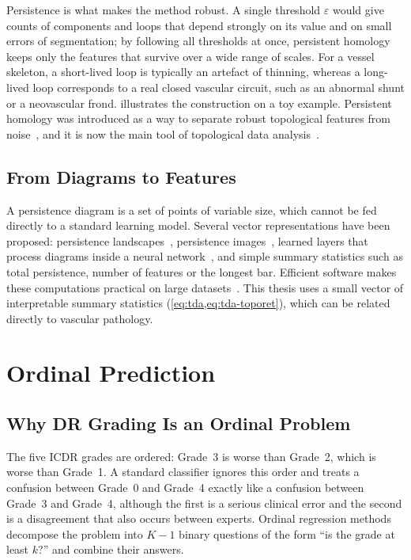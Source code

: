 Persistence is what makes the method robust. A single threshold $\varepsilon$ would give
counts of components and loops that depend strongly on its value and on small errors of
segmentation; by following all thresholds at once, persistent homology keeps only the
features that survive over a wide range of scales. For a vessel skeleton, a short-lived
loop is typically an artefact of thinning, whereas a long-lived loop corresponds to a real
closed vascular circuit, such as an abnormal shunt or a neovascular frond.
 illustrates the construction on a toy example. Persistent homology
was introduced as a way to separate robust topological features from
noise~\cite{edelsbrunner2002persistence,zomorodian2005computing}, and it is now the main
tool of topological data analysis~\cite{carlsson2009topology,chazal2021intro}.



\subsection{From Diagrams to Features}

A persistence diagram is a set of points of variable size, which cannot be fed directly to
a standard learning model. Several vector representations have been proposed: persistence
landscapes~\cite{bubenik2015landscapes}, persistence images~\cite{adams2017images}, learned
layers that process diagrams inside a neural
network~\cite{hofer2017topological,carriere2020perslay}, and simple summary statistics such
as total persistence, number of features or the longest bar. Efficient software makes these
computations practical on large datasets~\cite{otter2017roadmap,maria2014gudhi,
tauzin2021giotto}. This thesis uses a small vector of interpretable summary statistics
(\cref{eq:tda,eq:tda-toporet}), which can be related directly to vascular pathology.

\section{Ordinal Prediction}
\label{sec:coral}

\subsection{Why DR Grading Is an Ordinal Problem}

The five ICDR grades are ordered: Grade~3 is worse than Grade~2, which is worse than
Grade~1. A standard classifier ignores this order and treats a confusion between Grade~0
and Grade~4 exactly like a confusion between Grade~3 and Grade~4, although the first is a
serious clinical error and the second is a disagreement that also occurs between experts.
Ordinal regression methods decompose the problem into $K-1$ binary questions of the form
``is the grade at least $k$?'' and combine their answers.

